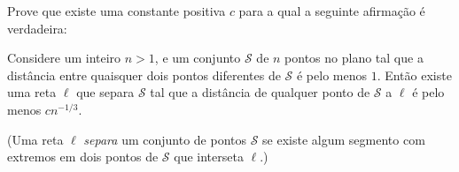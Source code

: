 Prove que existe uma constante positiva $c$ para a qual a seguinte afirmação é verdadeira:

Considere um inteiro $n > 1$, e um conjunto $\mathcal{S}$ de $n$ pontos no plano tal que a distância entre
quaisquer dois pontos diferentes de $\mathcal{S}$ é pelo menos $1$. Então existe uma reta $\ell$ que separa $\mathcal{S}$ tal que a distância de qualquer ponto de $\mathcal{S}$ a $\ell$ é pelo menos $cn^{-1/3}$.

(Uma reta $\ell$ \emph{separa} um conjunto de pontos $\mathcal{S}$ se existe algum segmento com extremos em dois
pontos de $\mathcal{S}$ que interseta $\ell$.)

